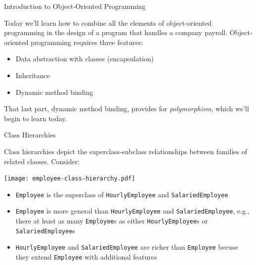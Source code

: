 \documentclass{beamer}
\author[Chris Simpkins] 
{Christopher Simpkins \\\texttt{chris.simpkins@gatech.edu}}
\institute[Georgia Tech] %
\date[CS 1331]{}
\begin{document}
\begin{frame}
  \titlepage
\end{frame}

\begin{frame}[fragile]{Introduction to Object-Oriented Programming}


Today we'll learn how to combine all the elements of object-oriented programming in the design of a program that handles a company payroll.  Object-oriented programming requires three features:
\begin{itemize}
\item Data abstraction with classes (encapsulation)
\item Inheritance
\item Dynamic method binding
\end{itemize}

That last part, dynamic method binding, provides for {\it polymorphism}, which we'll begin to learn today.

\end{frame}

\begin{frame}[fragile]{Class Hierarchies}

\vspace{-.05in}
Class hierarchies depict the superclass-subclass relationships between families of related classes.  Consider:
\vspace{-.05in}
\begin{center}
\texttt{[image: employee-class-hierarchy.pdf]}
\end{center}
\vspace{-.2in}
\begin{itemize}
\item {\tt Employee} is the superclass of {\tt HourlyEmployee} and {\tt SalariedEmployee}
\item {\tt Employee} is more general than {\tt HourlyEmployee} and {\tt SalariedEmployee}, e.g., there at least as many {\tt Employee}s as either {\tt HourlyEmployee}s or {\tt SalariedEmployee}s
\item {\tt HourlyEmployee} and {\tt SalariedEmployee} are richer than {\tt Employee} becuse they extend {\tt Employee} with additional features
\end{itemize}


\end{frame}
\end{document}
